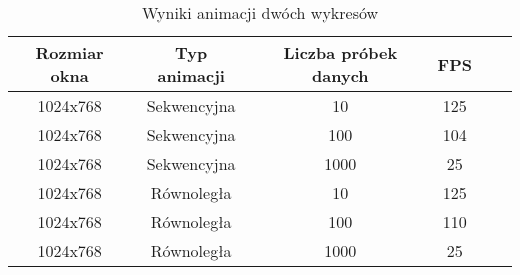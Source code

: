 \begin{table}\footnotesize
\centering
\caption{Wyniki animacji dwóch wykresów}
\label{tab:wykresy}
\begin{tabular}{|c|c|c|c|c|c|}
\hline
Rozmiar okna & Typ animacji & Liczba próbek danych & FPS\\
\hline
1024x768 & Sekwencyjna & 10 & 125\\
\hline
1024x768 & Sekwencyjna &  100 & 104\\
\hline
1024x768 & Sekwencyjna &  1000 & 25\\
\hline
1024x768 & Równoległa & 10 & 125\\
\hline
1024x768 & Równoległa &  100 & 110\\
\hline
1024x768 & Równoległa &  1000 & 25\\
\hline
\end{tabular}
\end{table}






